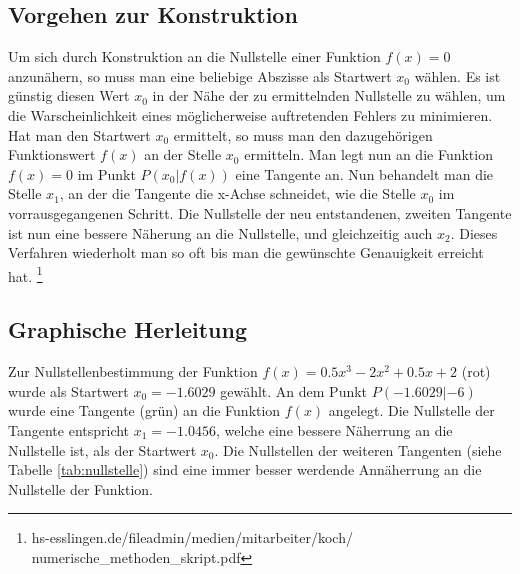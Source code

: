 \documentclass[a4paper,12pt,fleqn,oneside]{article}
\begin{document}
	\subsection{Vorgehen zur Konstruktion}
		Um sich durch Konstruktion an die Nullstelle einer Funktion $f(x) = 0$ anzunähern, so muss man eine beliebige Abszisse als Startwert $x_0$
		wählen. Es ist günstig diesen Wert $x_0$ in der Nähe der zu ermittelnden Nullstelle zu wählen, um die Warscheinlichkeit eines möglicherweise
		auftretenden Fehlers zu minimieren. Hat man den Startwert $x_0$ ermittelt, so muss man den dazugehörigen Funktionswert $f(x)$ an der Stelle
		$x_0$ ermitteln. Man legt nun an die Funktion $f(x) = 0$ im Punkt $P(x_0|f(x))$ eine Tangente an. Nun behandelt man die Stelle $x_1$, an der
		die Tangente die x-Achse schneidet, wie die Stelle $x_0$ im vorrausgegangenen Schritt. Die Nullstelle der neu entstandenen, zweiten Tangente
		ist nun eine bessere Näherung an die Nullstelle, und gleichzeitig auch $x_2$. Dieses Verfahren wiederholt man so oft bis man die gewünschte
		Genauigkeit erreicht hat. \footnote{hs-esslingen.de/fileadmin/medien/mitarbeiter/koch/\\numerische\_methoden\_skript.pdf}
		
\newpage

	\subsection{Graphische Herleitung}
		Zur Nullstellenbestimmung der Funktion $f(x) = \num{0.5}x^3 - 2x^2 + \num{0.5}x + 2$ (rot) wurde als Startwert $x_0 = \num{-1.6029}$
		gewählt. An dem Punkt $P(\num{-1.6029}|\num{-6})$ wurde eine Tangente (grün) an die Funktion $f(x)$ angelegt. Die Nullstelle der Tangente
		entspricht $x_1 = \num{-1.0456}$, welche eine bessere Näherrung an die Nullstelle ist, als der Startwert $x_0$. Die Nullstellen der weiteren
		Tangenten (siehe Tabelle \ref{tab:nullstelle}) sind eine immer besser werdende Annäherrung an die Nullstelle der Funktion.
		
\end{document}

